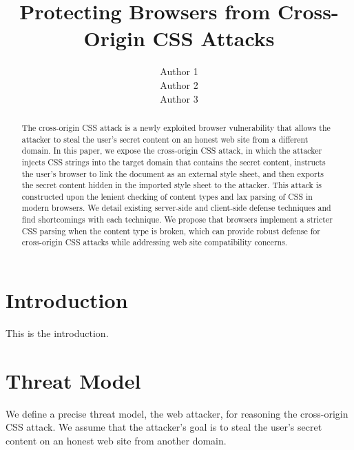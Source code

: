 \documentclass{acm_proc_article-sp}
\begin{document}
\title{Protecting Browsers from Cross-Origin CSS Attacks}

\author{
\alignauthor
Author 1\\
\alignauthor
Author 2\\
\alignauthor
Author 3\\
}

\maketitle
\begin{abstract}
The cross-origin CSS attack is a newly exploited browser vulnerability that allows the attacker to steal the user's secret content on an honest web site from a different domain. In this paper, we expose the cross-origin CSS attack, in which the attacker injects CSS strings into the target domain that contains the secret content, instructs the user's browser to link the document as an external style sheet, and then exports the secret content hidden in the imported style sheet to the attacker. This attack is constructed upon the lenient checking of content types and lax parsing of CSS in modern browsers. We detail existing server-side and client-side defense techniques and find shortcomings with each technique. We propose that browsers implement a stricter CSS parsing when the content type is broken, which can provide robust defense for cross-origin CSS attacks while addressing web site compatibility concerns.
\end{abstract}




\section{Introduction}
This is the introduction.

\section{Threat Model}
We define a precise threat model, the web attacker, for reasoning the cross-origin CSS attack. We assume that the attacker's goal is to steal the user's secret content on an honest web site from another domain.
\end{document}
